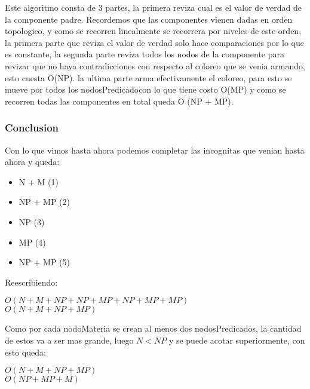     Este algoritmo consta de 3 partes, la primera reviza cual es el valor de verdad de la componente padre. Recordemos que las componentes vienen dadas en orden topologico, y como se recorren linealmente se recorrera por niveles de este orden, la primera parte que reviza el valor de verdad solo hace comparaciones por lo que es constante, la segunda parte reviza todos los nodos de la componente para revizar que no haya contradicciones con respecto al coloreo que se venia armando, esto cuesta O(NP). la ultima parte arma efectivamente el coloreo, para esto se mueve por todos los nodosPredicadocon lo que tiene costo O(MP) y como se recorren todas las componentes en total queda O (NP + MP).
    
\pagebreak    
\subsubsection{Conclusion}

    Con lo que vimos hasta ahora podemos completar las incognitas que venian hasta ahora y queda: \\
    \begin{itemize}
        \item N + M (1)
        \item NP + MP (2)
        \item NP (3)
        \item MP (4)
        \item NP + MP (5)
    \end{itemize}
    
    Reescribiendo: \\
    
    {\centering
        \vspace{5mm}
        $O(N + M + NP + NP + MP + NP + MP + MP)$ \\
        \vspace{5mm}
        $O(N + M + NP + MP)$\\
        \vspace{5mm}
        \par
    }
    
    Como por cada nodoMateria se crean al menos dos nodosPredicados, la cantidad de estos va a ser mas grande, luego $N < NP$ y se puede acotar superiormente, con esto queda: \\
    
    {\centering
        \vspace{5mm}
        $O(N + M + NP + MP)$\\
        \vspace{5mm}
        $O(NP + MP + M)$ \\
        \vspace{5mm}
        \par
    }
